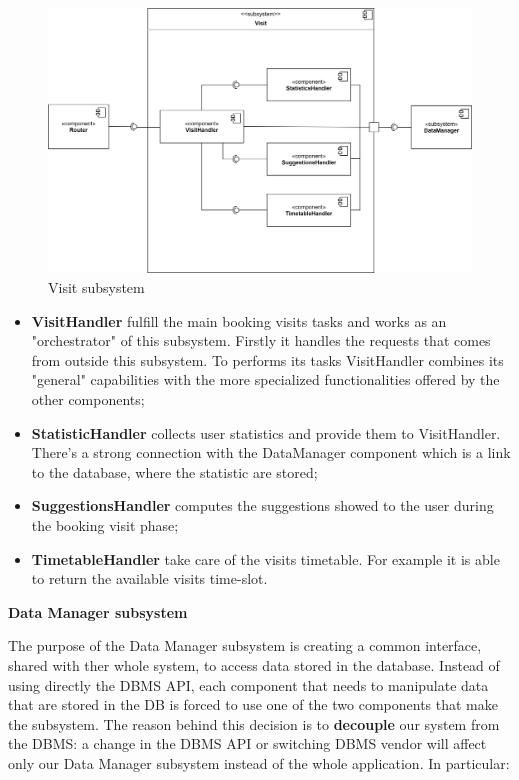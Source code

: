 \documentclass[]{article}
\begin{document}
	\begin{figure}[H]
		\centering
		\includegraphics[scale=0.73]{ComponentView/VisitComponent}
		\caption{Visit subsystem}
		\label{fig:visitSubsystem}
	\end{figure}
	
	\begin{itemize}
		\item \textbf{VisitHandler} fulfill the main booking visits tasks and works as an "orchestrator" of this subsystem.
		Firstly it handles the requests that comes from outside this subsystem. To performs its tasks VisitHandler combines its "general" capabilities with the more specialized functionalities offered by the other components;
		\item \textbf{StatisticHandler} collects user statistics and provide them to VisitHandler. There's a strong connection with the DataManager component which is a link to the database, where the statistic are stored;
		\item \textbf{SuggestionsHandler} computes the suggestions showed to the user during the booking visit phase;
		\item \textbf{TimetableHandler} take care of the visits timetable. For example it is able to return the available visits time-slot.
	\end{itemize}
	

	

		\bigskip\bigskip
		
		\textbf{Data Manager subsystem} \newline
		
		The purpose of the Data Manager subsystem is creating a common interface, shared with ther whole system, to access data stored in the database. \newline
		Instead of using directly the DBMS API, each component that needs to manipulate data that are stored in the DB is forced to use one of the two components that make the subsystem. \newline
		The reason behind this decision is to \textbf{decouple} our system from the DBMS: a change in the DBMS API or switching DBMS vendor will affect only our Data Manager subsystem instead of the whole application. \newline
		In particular:
		
\end{document}
